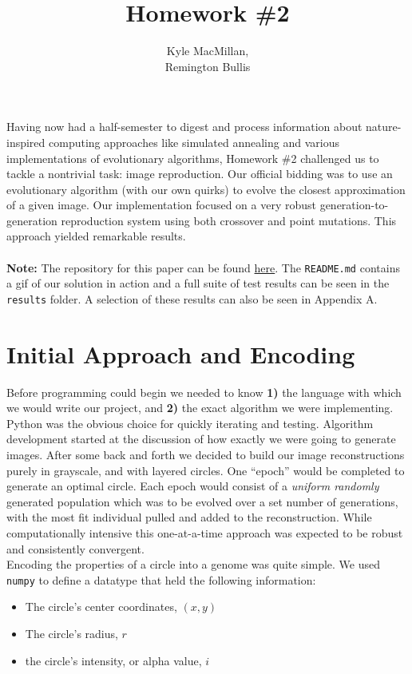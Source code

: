\documentclass[12pt]{article}
\title{Homework \#2}
\author{Kyle MacMillan, \\Remington Bullis}
\begin{document}
\maketitle

Having now had a half-semester to digest and process information about nature-inspired computing approaches like simulated annealing and various implementations of evolutionary algorithms, Homework \#2 challenged us to tackle a nontrivial task: image reproduction. Our official bidding was to use an evolutionary algorithm (with our own quirks)  to evolve the closest approximation of a given image. Our implementation focused on a very robust generation-to-generation reproduction system using both crossover and point mutations. This approach yielded remarkable results. 
\\ \\
\textbf{Note: }The repository for this paper can be found \href{https://github.com/macattackftw/ncGA}{here}. 
The \verb|README.md| contains a gif of our solution in action and a full suite of test results can be seen in the \verb|results| folder. A selection of these results can also be seen in Appendix A. 


\section*{Initial Approach and Encoding}
Before programming could begin we needed to know \textbf{1)} the language with which we would write our project, and \textbf{2)} the exact algorithm we were implementing. Python was the obvious choice for quickly iterating and testing. Algorithm development started at the discussion of how exactly we were going to generate images. After some back and forth we decided to build our image reconstructions purely in grayscale, and with layered circles. One ``epoch'' would be completed to generate an optimal circle. Each epoch would consist of a \textit{uniform randomly} generated population which was to be evolved over a set number of generations, with the most fit individual pulled and added to the reconstruction. While computationally intensive this one-at-a-time approach was expected to be robust and consistently convergent. 
\\
Encoding the properties of a circle into a genome was quite simple. We used \verb|numpy| to define a datatype that held the following information:
\begin{itemize}
\item The circle's center coordinates, $(x, y)$
\item The circle's radius, $r$
\item the circle's intensity, or alpha value, $i$
\end{itemize}
\end{document}
